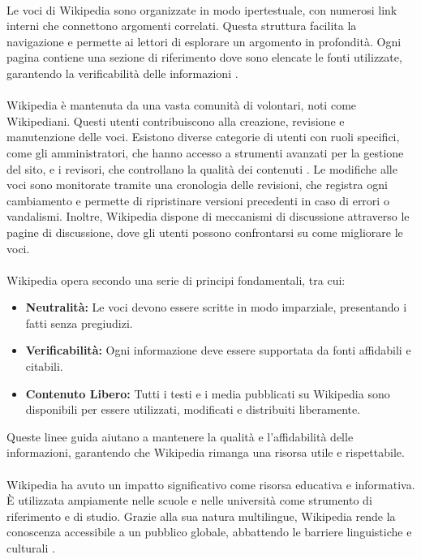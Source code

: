\documentclass[12pt,a4paper]{report}
\begin{document}
\paragraph*{}
Le voci di Wikipedia sono organizzate in modo ipertestuale, con numerosi link interni che connettono argomenti correlati. Questa struttura facilita la navigazione e permette ai lettori di esplorare un argomento in profondità. Ogni pagina contiene una sezione di riferimento dove sono elencate le fonti utilizzate, garantendo la verificabilità delle informazioni \cite{denning2005wikipedia}.
\paragraph*{}
Wikipedia è mantenuta da una vasta comunità di volontari, noti come Wikipediani. Questi utenti contribuiscono alla creazione, revisione e manutenzione delle voci. Esistono diverse categorie di utenti con ruoli specifici, come gli amministratori, che hanno accesso a strumenti avanzati per la gestione del sito, e i revisori, che controllano la qualità dei contenuti \cite{jemielniak2014wikipedia}. Le modifiche alle voci sono monitorate tramite una cronologia delle revisioni, che registra ogni cambiamento e permette di ripristinare versioni precedenti in caso di errori o vandalismi. Inoltre, Wikipedia dispone di meccanismi di discussione attraverso le pagine di discussione, dove gli utenti possono confrontarsi su come migliorare le voci.
\paragraph*{}
Wikipedia opera secondo una serie di principi fondamentali, tra cui:
\begin{itemize}
    \item \textbf{Neutralità:} Le voci devono essere scritte in modo imparziale, presentando i fatti senza pregiudizi.
    \item \textbf{Verificabilità:} Ogni informazione deve essere supportata da fonti affidabili e citabili.
    \item \textbf{Contenuto Libero:} Tutti i testi e i media pubblicati su Wikipedia sono disponibili per essere utilizzati, modificati e distribuiti liberamente.
\end{itemize}
Queste linee guida aiutano a mantenere la qualità e l'affidabilità delle informazioni, garantendo che Wikipedia rimanga una risorsa utile e rispettabile.
\paragraph*{}
Wikipedia ha avuto un impatto significativo come risorsa educativa e informativa. È utilizzata ampiamente nelle scuole e nelle università come strumento di riferimento e di studio. Grazie alla sua natura multilingue, Wikipedia rende la conoscenza accessibile a un pubblico globale, abbattendo le barriere linguistiche e culturali \cite{history_of_wikis}.
\end{document}
